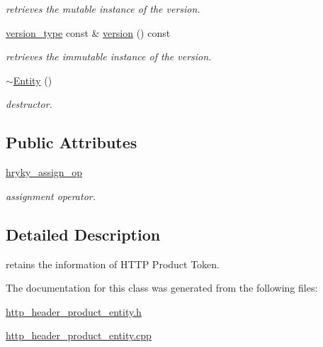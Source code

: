 \begin{DoxyCompactItemize}
\begin{DoxyCompactList}\small\item\em retrieves the mutable instance of the version. \end{DoxyCompactList}\item 
\hypertarget{classhryky_1_1http_1_1header_1_1product_1_1_entity_a7eef9d546232dd5d10a18f09ad37540b}{\hyperlink{classhryky_1_1_vector}{version\-\_\-type} const \& \hyperlink{classhryky_1_1http_1_1header_1_1product_1_1_entity_a7eef9d546232dd5d10a18f09ad37540b}{version} () const }\label{classhryky_1_1http_1_1header_1_1product_1_1_entity_a7eef9d546232dd5d10a18f09ad37540b}

\begin{DoxyCompactList}\small\item\em retrieves the immutable instance of the version. \end{DoxyCompactList}\item 
\hypertarget{classhryky_1_1http_1_1header_1_1product_1_1_entity_ac9198764cd618e4475493aabf3016a59}{\hyperlink{classhryky_1_1http_1_1header_1_1product_1_1_entity_ac9198764cd618e4475493aabf3016a59}{$\sim$\-Entity} ()}\label{classhryky_1_1http_1_1header_1_1product_1_1_entity_ac9198764cd618e4475493aabf3016a59}

\begin{DoxyCompactList}\small\item\em destructor. \end{DoxyCompactList}\end{DoxyCompactItemize}
\subsection*{Public Attributes}
\begin{DoxyCompactItemize}
\item 
\hypertarget{classhryky_1_1http_1_1header_1_1product_1_1_entity_ae6da7133b2f712731df917095da84227}{\hyperlink{classhryky_1_1http_1_1header_1_1product_1_1_entity_ae6da7133b2f712731df917095da84227}{hryky\-\_\-assign\-\_\-op}}\label{classhryky_1_1http_1_1header_1_1product_1_1_entity_ae6da7133b2f712731df917095da84227}

\begin{DoxyCompactList}\small\item\em assignment operator. \end{DoxyCompactList}\end{DoxyCompactItemize}


\subsection{Detailed Description}
retains the information of H\-T\-T\-P Product Token. 

The documentation for this class was generated from the following files\-:\begin{DoxyCompactItemize}
\item 
\hyperlink{http__header__product__entity_8h}{http\-\_\-header\-\_\-product\-\_\-entity.\-h}\item 
\hyperlink{http__header__product__entity_8cpp}{http\-\_\-header\-\_\-product\-\_\-entity.\-cpp}\end{DoxyCompactItemize}

